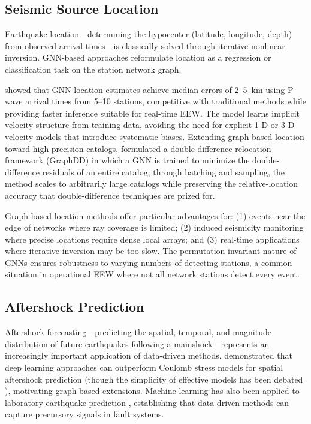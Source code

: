 \documentclass[review,authoryear]{elsarticle}
\begin{document}
\subsection{Seismic Source Location}

Earthquake location---determining the hypocenter (latitude, longitude, depth) from observed arrival times---is classically solved through iterative nonlinear inversion. GNN-based approaches reformulate location as a regression or classification task on the station network graph.

\citet{mcbrearty2023earthquake} showed that GNN location estimates achieve median errors of 2--5~km using P-wave arrival times from 5--10 stations, competitive with traditional methods while providing faster inference suitable for real-time EEW. The model learns implicit velocity structure from training data, avoiding the need for explicit 1-D or 3-D velocity models that introduce systematic biases. Extending graph-based location toward high-precision catalogs, \citet{mcbrearty2025graphdd} formulated a double-difference relocation framework (GraphDD) in which a GNN is trained to minimize the double-difference residuals of an entire catalog; through batching and sampling, the method scales to arbitrarily large catalogs while preserving the relative-location accuracy that double-difference techniques are prized for.

Graph-based location methods offer particular advantages for: (1) events near the edge of networks where ray coverage is limited; (2) induced seismicity monitoring where precise locations require dense local arrays; and (3) real-time applications where iterative inversion may be too slow. The permutation-invariant nature of GNNs ensures robustness to varying numbers of detecting stations, a common situation in operational EEW where not all network stations detect every event.

\subsection{Aftershock Prediction}

Aftershock forecasting---predicting the spatial, temporal, and magnitude distribution of future earthquakes following a mainshock---represents an increasingly important application of data-driven methods. \citet{devries2018deep} demonstrated that deep learning approaches can outperform Coulomb stress models for spatial aftershock prediction (though the simplicity of effective models has been debated \citep{mignan2020one}), motivating graph-based extensions. Machine learning has also been applied to laboratory earthquake prediction \citep{rouetleduc2017machine, johnson2021laboratory}, establishing that data-driven methods can capture precursory signals in fault systems.
\end{document}
